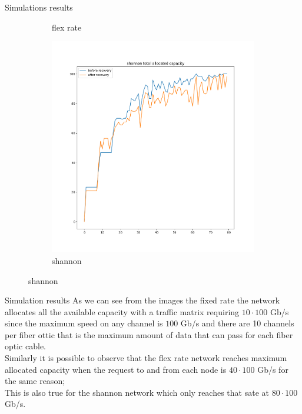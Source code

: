 \documentclass{beamer}
\begin{document}
\begin{frame}{Simulations results}
\begin{figure}
\begin{subfigure}{0.31\textwidth}
				\caption{flex rate}
			\end{subfigure}
			\hspace*{\fill}
			\begin{subfigure}{0.31\textwidth}
				\includegraphics[width=\linewidth]{Pictures/shannon capacity.png}
				\caption{shannon}
			\end{subfigure}
		\end{figure}
	\end{frame}
	\begin{frame}{Simulation results}
		As we can see from the images the fixed rate the network allocates all the available capacity with a traffic matrix requiring $10 \cdot 100$ Gb/s 
		since the maximum speed on any channel  is $100$ Gb/s and there are 10 channels per fiber ottic that is the maximum amount of data that can pass for each fiber optic cable.\pause\\
		Similarly it is possible to observe that the flex rate network reaches maximum allocated capacity when the request to and from each node is $40 \cdot 100$ Gb/s for the same reason;\pause\\
		This is also true for the shannon network which only reaches that sate at $80 \cdot 100$ Gb/s.
	\end{frame}
\end{document}

